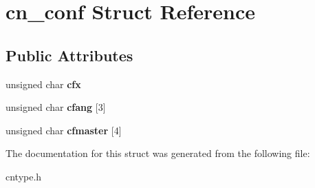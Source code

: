 \hypertarget{structcn__conf}{\section{cn\-\_\-conf Struct Reference}
\label{structcn__conf}
}
\subsection*{Public Attributes}
\begin{DoxyCompactItemize}
\item 
\hypertarget{structcn__conf_ab777d2a73a04f43fe5a6d15204f7189b}{unsigned char {\bfseries cfx}}\label{structcn__conf_ab777d2a73a04f43fe5a6d15204f7189b}

\item 
\hypertarget{structcn__conf_a0625d585dcec7d334d359bda669bf2a5}{unsigned char {\bfseries cfang} \mbox{[}3\mbox{]}}\label{structcn__conf_a0625d585dcec7d334d359bda669bf2a5}

\item 
\hypertarget{structcn__conf_a86d2328a35dfecc18b8afafbddbec4cc}{unsigned char {\bfseries cfmaster} \mbox{[}4\mbox{]}}\label{structcn__conf_a86d2328a35dfecc18b8afafbddbec4cc}

\end{DoxyCompactItemize}


The documentation for this struct was generated from the following file\-:\begin{DoxyCompactItemize}
\item 
cntype.\-h\end{DoxyCompactItemize}
